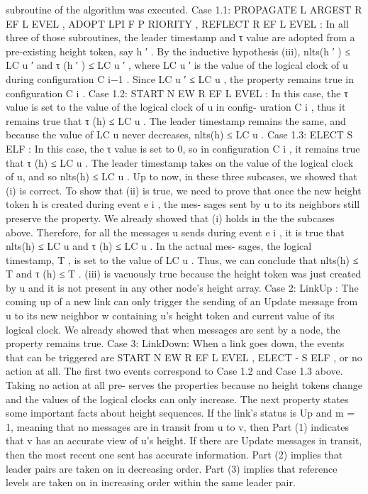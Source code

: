 \documentclass{article}
\begin{document}
subroutine of the algorithm was executed.
Case
1.1:
PROPAGATE L ARGEST R EF L EVEL ,
ADOPT LPI F P RIORITY , REFLECT R EF L EVEL :
In all
three of those subroutines, the leader timestamp and τ
value are adopted from a pre-existing height token, say
h ′ . By the inductive hypothesis (iii), nlts(h ′ ) ≤ LC u ′ and
τ (h ′ ) ≤ LC u ′ , where LC u ′ is the value of the logical clock
of u during configuration C i−1 . Since LC u ′ ≤ LC u , the
property remains true in configuration C i .
Case 1.2: START N EW R EF L EVEL : In this case, the τ
value is set to the value of the logical clock of u in config-
uration C i , thus it remains true that τ (h) ≤ LC u . The leader
timestamp remains the same, and because the value of LC u
never decreases, nlts(h) ≤ LC u .
Case 1.3: ELECT S ELF : In this case, the τ value is set
to 0, so in configuration C i , it remains true that τ (h) ≤ LC u .
The leader timestamp takes on the value of the logical clock
of u, and so nlts(h) ≤ LC u .
Up to now, in these three subcases, we showed that (i) is
correct. To show that (ii) is true, we need to prove that once
the new height token h is created during event e i , the mes-
sages sent by u to its neighbors still preserve the property.
We already showed that (i) holds in the the subcases above.
Therefore, for all the messages u sends during event e i , it is
true that nlts(h) ≤ LC u and τ (h) ≤ LC u . In the actual mes-
sages, the logical timestamp, T , is set to the value of LC u .
Thus, we can conclude that nlts(h) ≤ T and τ (h) ≤ T .
(iii) is vacuously true because the height token was just
created by u and it is not present in any other node’s height
array.
Case 2: LinkUp : The coming up of a new link can only
trigger the sending of an Update message from u to its new
neighbor w containing u’s height token and current value of
its logical clock. We already showed that when messages
are sent by a node, the property remains true.
Case 3: LinkDown: When a link goes down, the events
that can be triggered are START N EW R EF L EVEL , ELECT -
S ELF , or no action at all. The first two events correspond to
Case 1.2 and Case 1.3 above. Taking no action at all pre-
serves the properties because no height tokens change and
the values of the logical clocks can only increase.
The next property states some important facts about
height sequences. If the link’s status is Up and m = 1,
meaning that no messages are in transit from u to v, then
Part (1) indicates that v has an accurate view of u’s height.
If there are Update messages in transit, then the most
recent one sent has accurate information. Part (2) implies
that leader pairs are taken on in decreasing order. Part (3)
implies that reference levels are taken on in increasing
order within the same leader pair.
\end{document}

